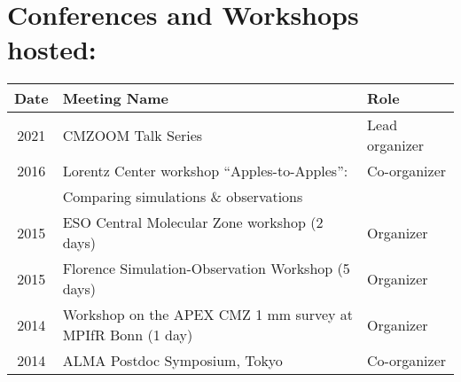 
\setlength{\extrarowheight}{0pt}
\section*{Conferences and Workshops hosted: }
\vspace{-12pt}
\begin{tabular}{cll}
    Date & Meeting Name & Role  \\
    \hline
    2021 & CMZOOM Talk Series  & Lead organizer \\
    2016 & Lorentz Center workshop ``Apples-to-Apples'':  & Co-organizer \\
         & Comparing simulations \& observations & \\
    2015 &      ESO Central Molecular Zone workshop (2 days)   & Organizer \\
    2015 &      Florence Simulation-Observation Workshop (5 days) & Organizer \\
    2014 &      Workshop on the APEX CMZ 1 mm survey at MPIfR Bonn (1 day)   & Organizer \\
    2014 & ALMA Postdoc Symposium, Tokyo & Co-organizer \\
\end{tabular}
